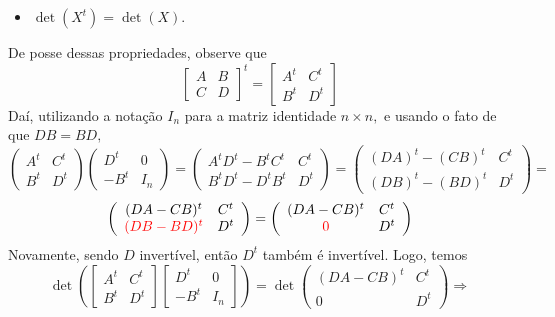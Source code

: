 \documentclass[11pt,a4paper]{article}
\begin{document}
{{\begin{itemize}
               \item $\det(X^t) = \det(X).$
           \end{itemize}
           }
           De posse dessas propriedades, observe que
           \[
            \left[ \begin{array}{cc} A & B \\ C & D \end{array} \right]^t =   \left[ \begin{array}{cc} A^t & C^t \\ B^t & D^t \end{array} \right]
           \]
           Daí, utilizando a notação $I_n$ para a matriz identidade $n \times n,$ e usando o fato de que $DB = BD,$
               \[
   \left( \begin{array}{cc} A^t & C^t \\ B^t & D^t \end{array} \right)  \left( \begin{array}{cc} D^t & 0 \\ -B^t & I_n \end{array} \right) = \left( \begin{array}{cc} A^tD^t - B^tC^t & C^t \\ B^tD^t - D^tB^t & D^t \end{array} \right) = \left( \begin{array}{cc} (DA)^t - (CB)^t & C^t \\ (DB)^t - (BD)^t & D^t \end{array} \right) = \]\[\left( \begin{array}{cc} (DA - CB)^t & C^t \\ \textcolor{red}{(DB - BD)^t} & D^t \end{array} \right) = \left( \begin{array}{cc} (DA - CB)^t & C^t \\ \textcolor{red}{0} & D^t \end{array} \right) 
    \]
    Novamente, sendo $D$ invertível, então $D^t$ também é invertível. Logo, temos
                   \[
   \det\left( \left[\begin{array}{cc} A^t & C^t \\ B^t & D^t \end{array} \right]  \left[ \begin{array}{cc} D^t & 0 \\ -B^t & I_n \end{array} \right] \right) = \det \left( \begin{array}{cc} (DA - CB)^t & C^t \\ 0 & D^t \end{array} \right) \Rightarrow
\]}
\end{document}
